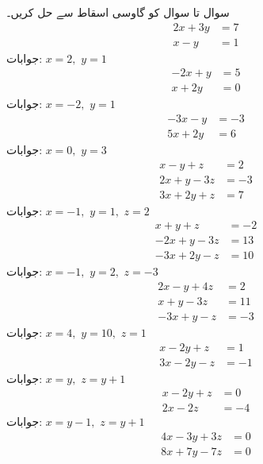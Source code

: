 سوال  تا سوال  کو گاوسی اسقاط سے حل کریں۔
\quad
\begin{align*}
2x+3y&=7\\
x-y&=1
\end{align*}
جوابات:\quad
$x=2,\,\,y=1$
\quad
\begin{align*}
-2x+y&=5\\
x+2y&=0
\end{align*}
جوابات:\quad
$x=-2,\,\,y=1$
\quad
\begin{align*}
-3x-y&=-3\\
5x+2y&=6
\end{align*}
جوابات:\quad
$x=0,\,\,y=3$
\quad
\begin{align*}
x-y+z&=2\\
2x+y-3z&=-3\\
3x+2y+z&=7
\end{align*}
جوابات:\quad
$x=-1,\,\,y=1,\,\,z=2$
\quad
\begin{align*}
x+y+z&=-2\\
-2x+y-3z&=13\\
-3x+2y-z&=10
\end{align*}
جوابات:\quad
$x=-1,\,\,y=2,\,\,z=-3$
\quad
\begin{align*}
2x-y+4z&=2\\
x+y-3z&=11\\
-3x+y-z&=-3
\end{align*}
جوابات:\quad
$x=4,\,\,y=10,\,\,z=1$
\quad
\begin{align*}
x-2y+z&=1\\
3x-2y-z&=-1
\end{align*}
جوابات:\quad
$x=y,\,\,z=y+1$
\quad
\begin{align*}
x-2y+z&=0\\
2x-2z&=-4
\end{align*}
جوابات:\quad
$x=y-1,\,\,z=y+1$
\quad
\begin{align*}
4x-3y+3z&=0\\
8x+7y-7z&=0
\end{align*}
